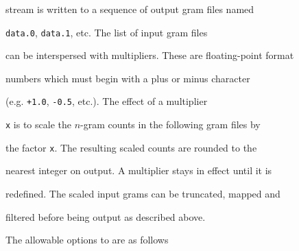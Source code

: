 stream is written to a sequence of output gram files named


\texttt{data.0}, \texttt{data.1}, etc. The list of input gram files


can be interspersed with multipliers. These are floating-point format


numbers which must begin with a plus or minus character


(e.g. \texttt{+1.0}, \texttt{-0.5}, etc.). The effect of a multiplier


\texttt{x} is to scale the $n$-gram counts in the following gram files by


the factor \texttt{x}. The resulting scaled counts are rounded to the


nearest integer on output. A multiplier stays in effect until it is


redefined. The scaled input grams can be truncated, mapped and


filtered before being output as described above.





The allowable options to  are as follows





